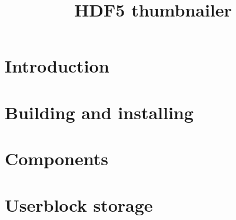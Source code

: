\documentclass[12pt,a4paper,german]{scrartcl}
\def\thetitle{HDF5 thumbnailer}
\begin{document}
%

\title{\thetitle}
%
\newpage
%
\tableofcontents
\newpage

\section{Introduction}

\newpage

\section{Building and installing}

\newpage

\section{Components}
\label{sec:Components}

\newpage

\section{Userblock storage}

%
%
\newpage
\listoffigures
%
\lstlistoflistings
%
\end{document}

